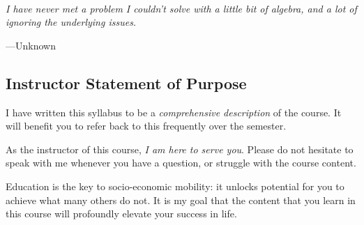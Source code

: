 \documentclass[letterpaper,twoside]{article}
\newcommand\Ie[1]{\textit{i.e.}, #1}
\begin{document}
\begin{titlepage}
\begin{center}
    \end{center}
    \noindent
    \
    \large
    \begin{center}
        \parbox{4in}
        {
            \textit{I have never met a problem I couldn't solve with a little bit of algebra, and a lot of ignoring the underlying issues.}

            \normalsize
            \vspace*{2mm}
            \hspace*{\fill}---Unknown
        }
    \end{center}
    \vspace*{1in}
\end{titlepage}

\newpage
\restoregeometry
{}
\setcounter{section}{-1}
\setcounter{page}{0}

\begin{center}
    \begin{minipage}{0.5\textwidth}
        \justify
        \section*{Instructor Statement of Purpose}
        I have written this syllabus to be a \textit{comprehensive description} of the course.
        It will benefit you to refer back to this frequently over the semester.

        \vspace{2mm}
        \noindent
        As the instructor of this course, \textit{I am here to serve you}.
        Please do not hesitate to speak with me whenever you have a question, or struggle with the course content.

        \vspace{2mm}
        \noindent
        Education is the key to socio-economic mobility: it unlocks potential for you to achieve what many others do not.
        It is my goal that the content that you learn in this course will profoundly elevate your success in life.
    \end{minipage}
\end{center}
\end{document}
